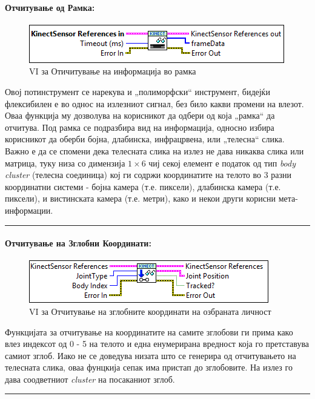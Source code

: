 \documentclass[11pt]{article}
\begin{document}
      \paragraph{Отчитување од Рамка:\\}
	      \begin{figure}[H]
	        \includegraphics[width=0.55\linewidth]{./images/kinect_read_border.png}
	        \caption{VI за Отичитување на информација во рамка}
	        \label{fig:kinect_read.png}
	        \raggedright
	        \end{figure}
        Овој потинструмент се нарекува и „полиморфски“ инструмент, бидејќи флексибилен е во однос на излезниот сигнал, без било какви промени на влезот. Оваа функција му дозволува на корисникот да одбери од која „рамка“ да отчитува. Под рамка се подразбира вид на информација, односно избира корисникот да оберби бојна, длабинска, инфрацрвена, или „телесна“ слика. Важно е да се спомени дека телесната слика на излез не дава никаква слика или матрица, туку низа со димензија $1 \times 6$ чиј секој елемент е податок од тип \textit{body cluster} (телесна соединица) кој ги содржи координатите на телото во 3 разни координатни системи - бојна камера (т.е. пиксели), длабинска камера (т.е. пиксели), и вистинската камера (т.е. метри), како и некои други корисни мета-информации.\\
        \textcolor[RGB]{150,150,150}{\rule{\linewidth}{1.6pt}}

      \paragraph{Отчитување на Зглобни Координати:\\}
	      \begin{figure}[H]
	        \includegraphics[width=0.55\linewidth]{./images/kinect_joints_border.png}
	        \caption{VI за Отчитување на зглобните координати на озбраната личност}
	        \label{fig:kinect_joints.png}
	        \raggedright
	        \end{figure}
        Функцијата за отчитување на координатите на самите зглобови ги прима како влез индексот од 0 - 5 на телото и една енумерирана вредност која го претставува самиот зглоб. Иако не се доведува низата што се генерира од отчитувањето на телесната слика, оваа фунцкија сепак има пристап до зглобовите. На излез го дава соодветниот \textit{cluster} на посаканиот зглоб.\\
        \textcolor[RGB]{150,150,150}{\rule{\linewidth}{1.6pt}}
\end{document}
